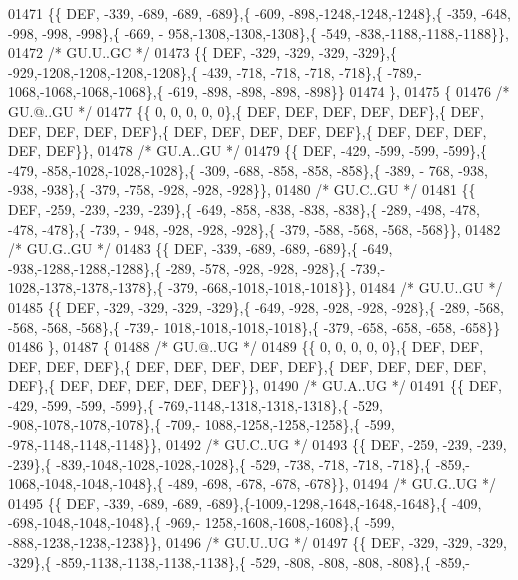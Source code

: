\begin{DoxyCode}
01471 \{\{  DEF, -339, -689, -689, -689\},\{ -609, -898,-1248,-1248,-1248\},\{ -359, -648, -998, -998, -998\},\{ -669, -
      958,-1308,-1308,-1308\},\{ -549, -838,-1188,-1188,-1188\}\},
01472 \textcolor{comment}{/* GU.U..GC */}
01473 \{\{  DEF, -329, -329, -329, -329\},\{ -929,-1208,-1208,-1208,-1208\},\{ -439, -718, -718, -718, -718\},\{ -789,-
      1068,-1068,-1068,-1068\},\{ -619, -898, -898, -898, -898\}\}
01474 \},
01475 \{
01476 \textcolor{comment}{/* GU.@..GU */}
01477 \{\{    0,    0,    0,    0,    0\},\{  DEF,  DEF,  DEF,  DEF,  DEF\},\{  DEF,  DEF,  DEF,  DEF,  DEF\},\{  DEF,  
      DEF,  DEF,  DEF,  DEF\},\{  DEF,  DEF,  DEF,  DEF,  DEF\}\},
01478 \textcolor{comment}{/* GU.A..GU */}
01479 \{\{  DEF, -429, -599, -599, -599\},\{ -479, -858,-1028,-1028,-1028\},\{ -309, -688, -858, -858, -858\},\{ -389, -
      768, -938, -938, -938\},\{ -379, -758, -928, -928, -928\}\},
01480 \textcolor{comment}{/* GU.C..GU */}
01481 \{\{  DEF, -259, -239, -239, -239\},\{ -649, -858, -838, -838, -838\},\{ -289, -498, -478, -478, -478\},\{ -739, -
      948, -928, -928, -928\},\{ -379, -588, -568, -568, -568\}\},
01482 \textcolor{comment}{/* GU.G..GU */}
01483 \{\{  DEF, -339, -689, -689, -689\},\{ -649, -938,-1288,-1288,-1288\},\{ -289, -578, -928, -928, -928\},\{ -739,-
      1028,-1378,-1378,-1378\},\{ -379, -668,-1018,-1018,-1018\}\},
01484 \textcolor{comment}{/* GU.U..GU */}
01485 \{\{  DEF, -329, -329, -329, -329\},\{ -649, -928, -928, -928, -928\},\{ -289, -568, -568, -568, -568\},\{ -739,-
      1018,-1018,-1018,-1018\},\{ -379, -658, -658, -658, -658\}\}
01486 \},
01487 \{
01488 \textcolor{comment}{/* GU.@..UG */}
01489 \{\{    0,    0,    0,    0,    0\},\{  DEF,  DEF,  DEF,  DEF,  DEF\},\{  DEF,  DEF,  DEF,  DEF,  DEF\},\{  DEF,  
      DEF,  DEF,  DEF,  DEF\},\{  DEF,  DEF,  DEF,  DEF,  DEF\}\},
01490 \textcolor{comment}{/* GU.A..UG */}
01491 \{\{  DEF, -429, -599, -599, -599\},\{ -769,-1148,-1318,-1318,-1318\},\{ -529, -908,-1078,-1078,-1078\},\{ -709,-
      1088,-1258,-1258,-1258\},\{ -599, -978,-1148,-1148,-1148\}\},
01492 \textcolor{comment}{/* GU.C..UG */}
01493 \{\{  DEF, -259, -239, -239, -239\},\{ -839,-1048,-1028,-1028,-1028\},\{ -529, -738, -718, -718, -718\},\{ -859,-
      1068,-1048,-1048,-1048\},\{ -489, -698, -678, -678, -678\}\},
01494 \textcolor{comment}{/* GU.G..UG */}
01495 \{\{  DEF, -339, -689, -689, -689\},\{-1009,-1298,-1648,-1648,-1648\},\{ -409, -698,-1048,-1048,-1048\},\{ -969,-
      1258,-1608,-1608,-1608\},\{ -599, -888,-1238,-1238,-1238\}\},
01496 \textcolor{comment}{/* GU.U..UG */}
01497 \{\{  DEF, -329, -329, -329, -329\},\{ -859,-1138,-1138,-1138,-1138\},\{ -529, -808, -808, -808, -808\},\{ -859,-

\end{DoxyCode}
